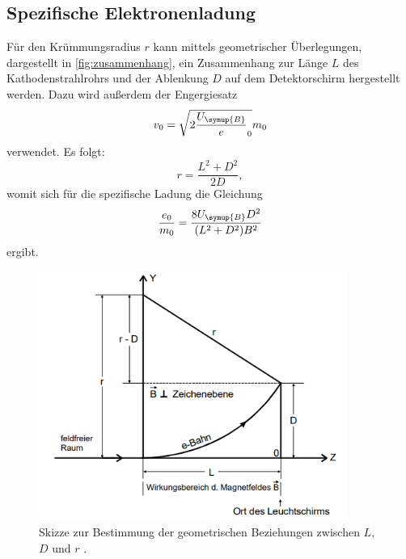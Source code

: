 \subsection{Spezifische Elektronenladung}
    Für den Krümmungsradius $r$ kann mittels geometrischer Überlegungen, dargestellt in \autoref{fig:zusammenhang}, ein 
    Zusammenhang zur Länge $L$ des Kathodenstrahlrohrs und der Ablenkung $D$ auf dem Detektorschirm hergestellt werden.
    Dazu wird außerdem der Engergiesatz
    \begin{equation}
    \label{eqn:energiesatz}
        v_0 = \sqrt{2 \frac{U_{\symup{B}}} e_0} {m_0}
    \end{equation}
    verwendet. Es folgt:
    \begin{equation}
    \label{eqn:zusammenhang}
        r = \frac{L^2 + D^2}{2D},    
    \end{equation}     
    womit sich für die spezifische Ladung die Gleichung
    \begin{equation}
    \label{eqn:spezifisch}
        \frac{e_0}{m_0} = \frac{8 U_{\symup{B}} D^2}{(L^2 + D^2)B^2}
    \end{equation}
    ergibt.    
    \begin{figure}
        \centering
        \includegraphics[width=0.9\textwidth]{content/zusammenhang.png}
        \caption{Skizze zur Bestimmung der geometrischen Beziehungen zwischen $L$, $D$ und $r$ \cite{V501-und-V502}.}
        \label{fig:zusammenhang}
    \end{figure}